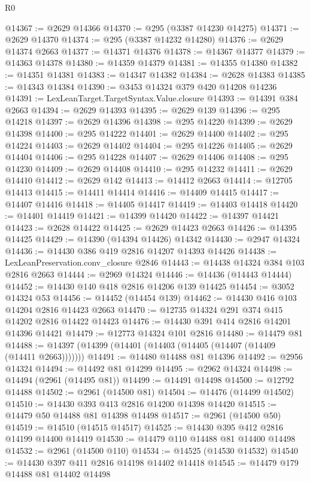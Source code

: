 \begin{lexlean}{R0}
\begin{coremodule}
@14367 := @2629 @14366
@14370 := @295 (@3387 @14230 @14275)
@14371 := @2629 @14370
@14374 := @295 (@3387 @14232 @14280)
@14376 := @2629 @14374 @2663
@14377 := @14371 @14376
@14378 := @14367 @14377
@14379 := @14363 @14378
@14380 := @14359 @14379
@14381 := @14355 @14380
@14382 := @14351 @14381
@14383 := @14347 @14382
@14384 := @2628 @14383
@14385 := @14343 @14384
@14390 := @3453 @14324 @379 @420 @14208 @14236
@14391 := LexLeanTarget.TargetSyntax.Value.closure
@14393 := @14391 @384 @2663
@14394 := @2629 @14393
@14395 := @2629 @139
@14396 := @295 @14218
@14397 := @2629 @14396
@14398 := @295 @14220
@14399 := @2629 @14398
@14400 := @295 @14222
@14401 := @2629 @14400
@14402 := @295 @14224
@14403 := @2629 @14402
@14404 := @295 @14226
@14405 := @2629 @14404
@14406 := @295 @14228
@14407 := @2629 @14406
@14408 := @295 @14230
@14409 := @2629 @14408
@14410 := @295 @14232
@14411 := @2629 @14410
@14412 := @2629 @142
@14413 := @14412 @2663
@14414 := @12705 @14413
@14415 := @14411 @14414
@14416 := @14409 @14415
@14417 := @14407 @14416
@14418 := @14405 @14417
@14419 := @14403 @14418
@14420 := @14401 @14419
@14421 := @14399 @14420
@14422 := @14397 @14421
@14423 := @2628 @14422
@14425 := @2629 @14423 @2663
@14426 := @14395 @14425
@14429 := @14390 (@14394 @14426) @14342
@14430 := @2947 @14324
@14436 := @14430 @386 @419 @2816 @14207 @14393 @14426
@14438 := LexLeanPreservation.conv_closure @2846
@14443 := @14438 @14324 @384 @103 @2816 @2663
@14444 := @2969 @14324
@14446 := @14436 (@14443 @14444)
@14452 := @14430 @140 @418 @2816 @14206 @139 @14425
@14454 := @3052 @14324 @53
@14456 := @14452 (@14454 @139)
@14462 := @14430 @416 @103 @14204 @2816 @14423 @2663
@14470 := @12735 @14324 @291 @374 @415 @14202 @2816 @14422 @14423
@14476 := @14430 @391 @414 @2816 @14201 @14396 @14421
@14479 := @12773 @14324 @101 @2816
@14480 := @14479 @81
@14488 := @14397 (@14399 (@14401 (@14403 (@14405 (@14407 (@14409 (@14411 @2663)))))))
@14491 := @14480 @14488 @81 @14396
@14492 := @2956 @14324
@14494 := @14492 @81 @14299
@14495 := @2962 @14324
@14498 := @14494 (@2961 (@14495 @81))
@14499 := @14491 @14498
@14500 := @12792 @14488
@14502 := @2961 (@14500 @81)
@14504 := @14476 (@14499 @14502)
@14510 := @14430 @393 @413 @2816 @14200 @14398 @14420
@14515 := @14479 @50 @14488 @81 @14398 @14498
@14517 := @2961 (@14500 @50)
@14519 := @14510 (@14515 @14517)
@14525 := @14430 @395 @412 @2816 @14199 @14400 @14419
@14530 := @14479 @110 @14488 @81 @14400 @14498
@14532 := @2961 (@14500 @110)
@14534 := @14525 (@14530 @14532)
@14540 := @14430 @397 @411 @2816 @14198 @14402 @14418
@14545 := @14479 @179 @14488 @81 @14402 @14498

\end{coremodule}
\end{lexlean}
